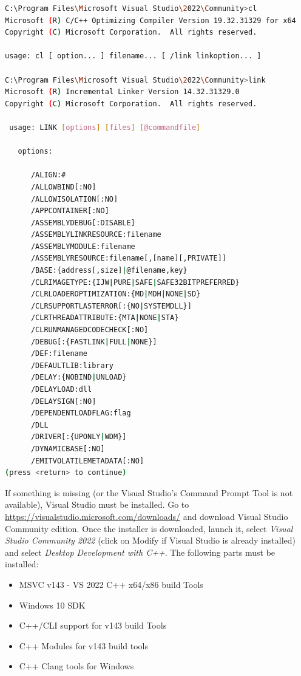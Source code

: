 \begin{lstlisting}[language=bash,caption={bash version}]
C:\Program Files\Microsoft Visual Studio\2022\Community>cl
Microsoft (R) C/C++ Optimizing Compiler Version 19.32.31329 for x64
Copyright (C) Microsoft Corporation.  All rights reserved.

usage: cl [ option... ] filename... [ /link linkoption... ]

C:\Program Files\Microsoft Visual Studio\2022\Community>link
Microsoft (R) Incremental Linker Version 14.32.31329.0
Copyright (C) Microsoft Corporation.  All rights reserved.

 usage: LINK [options] [files] [@commandfile]

   options:

      /ALIGN:#
      /ALLOWBIND[:NO]
      /ALLOWISOLATION[:NO]
      /APPCONTAINER[:NO]
      /ASSEMBLYDEBUG[:DISABLE]
      /ASSEMBLYLINKRESOURCE:filename
      /ASSEMBLYMODULE:filename
      /ASSEMBLYRESOURCE:filename[,[name][,PRIVATE]]
      /BASE:{address[,size]|@filename,key}
      /CLRIMAGETYPE:{IJW|PURE|SAFE|SAFE32BITPREFERRED}
      /CLRLOADEROPTIMIZATION:{MD|MDH|NONE|SD}
      /CLRSUPPORTLASTERROR[:{NO|SYSTEMDLL}]
      /CLRTHREADATTRIBUTE:{MTA|NONE|STA}
      /CLRUNMANAGEDCODECHECK[:NO]
      /DEBUG[:{FASTLINK|FULL|NONE}]
      /DEF:filename
      /DEFAULTLIB:library
      /DELAY:{NOBIND|UNLOAD}
      /DELAYLOAD:dll
      /DELAYSIGN[:NO]
      /DEPENDENTLOADFLAG:flag
      /DLL
      /DRIVER[:{UPONLY|WDM}]
      /DYNAMICBASE[:NO]
      /EMITVOLATILEMETADATA[:NO]
(press <return> to continue)

\end{lstlisting}

If something is missing (or the Visual Studio's Command Prompt Tool is not available), Visual Studio must be installed. Go to \href{https://visualstudio.microsoft.com/downloads/}{https://visualstudio.microsoft.com/downloads/} and download Visual Studio Community edition. Once the installer is downloaded, launch it, select \textit{Visual Studio Community 2022} (click on Modify if Visual Studio is already installed) and select \textit{Desktop Development with C++}. The following parts must be installed:

\begin{itemize}
	\item MSVC v143 - VS 2022 C++ x64/x86 build Tools
	\item Windows 10 SDK
	\item C++/CLI support for v143 build Tools
	\item C++ Modules for v143 build tools
	\item C++ Clang tools for Windows
\end{itemize}

